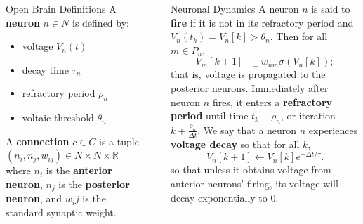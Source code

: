 \documentclass[final]{beamer}
\newlength{\sepwid}
\newlength{\onecolwid}
\newlength{\twocolwid}
\begin{document}
\begin{frame}[t]
\begin{columns}[t]
\begin{column}{\onecolwid}


 \begin{block}{Open Brain Definitions}
 A \textbf{neuron} $n \in N$ is defined by:
 \begin{itemize}
 \item voltage $V_n(t)$
 \item decay time $\tau_n$
 \item refractory period $\rho_n$
 \item voltaic threshold $\theta_n$
 \end{itemize}
  A \textbf{connection} $c \in C$ is a tuple $(n_i, n_j, w_{ij}) \in N \times N \times \mathbb{R}$
  where $n_i$ is  the \textbf{anterior neuron}, $n_j$ is the \textbf{posterior neuron}, and $w_ij$
  is the standard synaptic weight.
\end{block}

\end{column} %

\begin{column}{\sepwid}\end{column} %

\begin{column}{\twocolwid} %

\begin{columns}[t,totalwidth=\twocolwid] %

\begin{column}{\onecolwid}\vspace{-.6in} %



\begin{block}{Neuronal Dynamics}
  A neuron $n$ is said to \textbf{fire} if it is not in its refractory period and $V_n(t_{k}) = V_n[k] > \theta_n$. Then for all $m \in P_n$,
  \begin{equation*}
    V_m[k+1] {\ +_=\ } w_{nm} \sigma(V_n[k]); \label{eq:fire}
  \end{equation*}
  that is, voltage is propagated to the posterior neurons.
  Immediately after neuron $n$ fires, it enters  a \textbf{refractory period} until time $t_{k} + \rho_n$, or iteration $k + \frac{\rho_n}{\Delta t}$. 
  	We say that a neuron $n$ experiences \textbf{voltage decay} so that for all $k$,
	\begin{equation}
		V_n[k+1] \leftarrow V_n[k]e^{-\Delta t/\tau}. \label{eq:decay}
	\end{equation}
	so that unless it obtains voltage from anterior neurons' firing, its voltage will decay exponentially to 0.


\end{block}
\end{column}
\end{columns}
\end{column}
\end{columns}
\end{frame}
\end{document}
